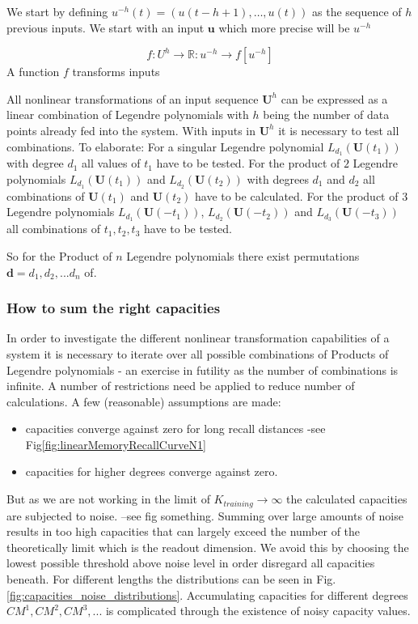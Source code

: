 We start by defining $u^{-h}(t) = (u(t-h + 1), \dots, u(t))$ as the sequence of $h$ previous inputs. 
We start with an input $\textbf{u}$ which more precise will be $u^{-h}$ 


	\begin{equation}
	f:U^{h}\rightarrow \mathbb{R}:u^{-h}\rightarrow f\left[ u^{-h}\right]
	\label{eq:legendre_f_U_equaiont}
	\end{equation}
A function $f$ transforms inputs 


All nonlinear transformations of an input sequence $\textbf{U}^{h}$ can be expressed as a linear combination of Legendre  polynomials with $h$ being the number of data points already fed into the system. With inputs in $\textbf{U}^{h}$ it is necessary to test all combinations. To elaborate: 
For a singular Legendre polynomial $L_{d_{1}}(\textbf{U}(t_1))$ with degree $d_1$ all values of $t_1$ have to be tested.
For the product of $2$ Legendre polynomials $L_{d_{1}}(\textbf{U}(t_1))$ and $L_{d_{2}}(\textbf{U}(t_2))$ with degrees $d_1$ and $d_2$ all combinations of $\textbf{U}(t_1)$ and $\textbf{U}(t_2)$ have to be calculated.
For the product of $3$ Legendre polynomials $L_{d_{1}}(\textbf{U}(-t_1))$, $L_{d_{2}}(\textbf{U}(-t_2))$ and $L_{d_{3}}(\textbf{U}(-t_3))$ all combinations of ${t_1,t_2,t_3}$ have to be tested.

So for the Product of $n$ Legendre polynomials there exist permutations ${\textbf{d}}={d_1,d_2,...d_n}$ of.

\subsubsection{How to sum the right capacities}
In order to investigate the different nonlinear transformation capabilities of a system it is necessary to iterate over all possible combinations of Products of Legendre polynomials - an exercise in futility as the number of combinations is infinite. A number of restrictions need be applied to reduce number of calculations. A few (reasonable) assumptions are made:
\begin{itemize}
	\item capacities converge against zero for long recall distances -see Fig\ref{fig:linearMemoryRecallCurveN1}
	\item capacities for higher degrees converge against zero.
\end{itemize}
	But as we are not working in the limit of $K_{training} \rightarrow \infty$ the calculated capacities are subjected to noise. --see fig something. Summing over large amounts of noise results in too high capacities that can largely exceed the number of the theoretically limit which is the readout dimension. We avoid this by choosing the lowest possible threshold above noise level in order disregard all capacities beneath. For different lengths the distributions can be seen in Fig.\ref{fig:capacities_noise_distributions}.
	Accumulating capacities for different degrees $CM^1,CM^2,CM^3, ...$ is complicated through the existence of noisy capacity values.







